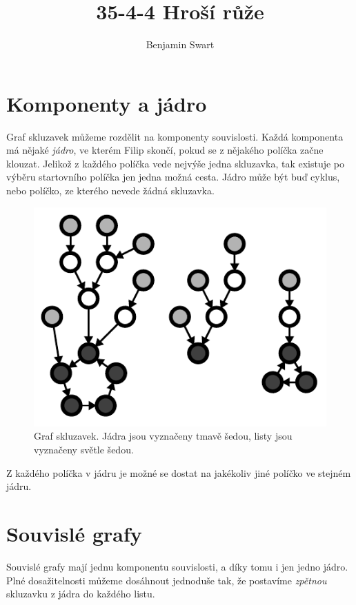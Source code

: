 \documentclass{article}
\title{35-4-4 Hroší růže}
\author{Benjamin Swart}
\begin{document}
\maketitle

\section{Komponenty a jádro}

Graf skluzavek můžeme rozdělit na komponenty souvislosti. Každá komponenta má nějaké \textit{jádro}, ve kterém Filip skončí, pokud se z nějakého políčka začne klouzat. Jelikož z každého políčka vede nejvýše jedna skluzavka, tak existuje po výběru startovního políčka jen jedna možná cesta. Jádro může být buď cyklus, nebo políčko, ze kterého nevede žádná skluzavka.

\begin{figure}[ht]
    \centering
    \includegraphics{cores.pdf}
    \caption[Graf skluzavek]{Graf skluzavek. Jádra jsou vyznačeny tmavě šedou, listy jsou vyznačeny světle šedou.}
\end{figure}

Z každého políčka v jádru je možné se dostat na jakékoliv jiné políčko ve stejném jádru.

\section{Souvislé grafy}

Souvislé grafy mají jednu komponentu souvislosti, a díky tomu i jen jedno jádro. Plné dosažitelnosti můžeme dosáhnout jednoduše tak, že postavíme \textit{zpětnou} skluzavku z jádra do každého listu.
\end{document}
